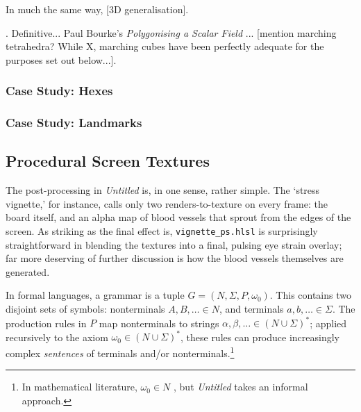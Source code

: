 \documentclass[a4paper, 11pt]{article}
\begin{document}
\begin{flushleft}
\vspace{5pt}\noindent
In much the same way, [3D generalisation].

\vspace{5pt}. Definitive... Paul Bourke's \textit{Polygonising a Scalar Field} \citeyearpar{bourkeMarchingCubes}... [mention marching tetrahedra? While X, marching cubes have been perfectly adequate for the purposes set out below...].

\subsubsection{Case Study: Hexes}


\subsubsection{Case Study: Landmarks}

\subsection{Procedural Screen Textures}\label{Procedural Screen Textures} %

The post-processing in \textit{Untitled} is, in one sense, rather simple. The `stress vignette,' for instance, calls only two renders-to-texture on every frame: the board itself, and an alpha map of blood vessels that sprout from the edges of the screen. As striking as the final effect is, \texttt{vignette\_ps.hlsl} is surprisingly straightforward in blending the textures into a final, pulsing eye strain overlay; far more deserving of further discussion is how the blood vessels themselves are generated.

\vspace{5pt}\noindent
In formal languages, a grammar is a tuple $G = (N,\Sigma,P,\omega_0)$. This contains two disjoint sets of symbols: nonterminals $A, B, \dots \in N$, and terminals $a, b, \dots \in \Sigma$. The production rules in $P$ map nonterminals to strings $\alpha, \beta, \dots \in (N\cup\Sigma)^*$; applied recursively to the axiom $\omega_0 \in (N\cup\Sigma)^*$, these rules can produce increasingly complex \textit{sentences} of terminals and/or nonterminals.\footnote{In mathematical literature, $
\omega_0 \in N$ \citep*{hopcroftFormalLanguages}, but \textit{Untitled} takes an informal approach.}


\end{flushleft}
\end{document}
